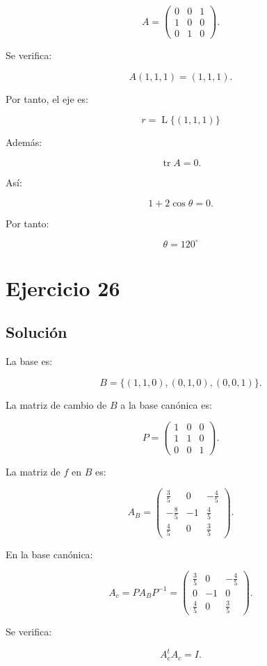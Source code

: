 \documentclass[11pt,a4paper]{article}
\newcommand{\tr}{\operatorname{tr}}
\newcommand{\Span}{\operatorname{L}}
\begin{document}
\[
A=
\begin{pmatrix}
0&0&1\\
1&0&0\\
0&1&0
\end{pmatrix}.
\]

Se verifica:

\[
A(1,1,1)=(1,1,1).
\]

Por tanto, el eje es:

\[
\boxed{
r=\Span\{(1,1,1)\}
}
\]

Además:

\[
\tr A=0.
\]

Así:

\[
1+2\cos\theta=0.
\]

Por tanto:

\[
\boxed{
\theta=120^\circ
}
\]

\section{Ejercicio 26}
\subsection{Solución}

La base es:

\[
B=
\{(1,1,0),(0,1,0),(0,0,1)\}.
\]

La matriz de cambio de \(B\) a la base canónica es:

\[
P=
\begin{pmatrix}
1&0&0\\
1&1&0\\
0&0&1
\end{pmatrix}.
\]

La matriz de \(f\) en \(B\) es:

\[
A_B=
\begin{pmatrix}
\frac35&0&-\frac45\\[1mm]
-\frac85&-1&\frac45\\[1mm]
\frac45&0&\frac35
\end{pmatrix}.
\]

En la base canónica:

\[
A_c
=
PA_BP^{-1}
=
\begin{pmatrix}
\frac35&0&-\frac45\\[1mm]
0&-1&0\\[1mm]
\frac45&0&\frac35
\end{pmatrix}.
\]

Se verifica:

\[
A_c^tA_c=I.
\]
\end{document}
